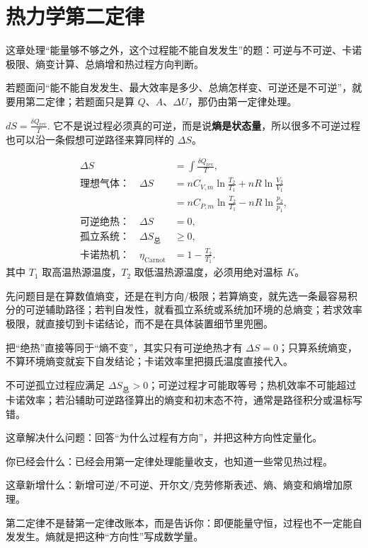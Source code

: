 \documentclass[lang=cn,11pt]{elegantbook}
\newcommand{\bridge}[1]{\begin{note}#1\end{note}}
\newcommand{\chapterroadmap}[3]{%
\begin{introduction}
 \item {\heiti 这章解决什么问题：}#1
 \item {\heiti 你已经会什么：}#2
 \item {\heiti 这章新增什么：}#3
\end{introduction}}
\begin{document}
\chapter{热力学第二定律}

\begin{skill}[第12章冲刺总手册]\label{sk:phys-ch12-overview}
 这章处理“能量够不够之外，这个过程能不能自发发生”的题：可逆与不可逆、卡诺极限、熵变计算、总熵增和热过程方向判断。

 若题面问“能不能自发发生、最大效率是多少、总熵怎样变、可逆还是不可逆”，就要用第二定律；若题面只是算 \(Q\)、\(A\)、\(\Delta U\)，那仍由第一定律处理。


 \(dS=\frac{\delta Q_{\mathrm{rev}}}{T}.\) 
它不是说过程必须真的可逆，而是说\textbf{熵是状态量}，所以很多不可逆过程也可以沿一条假想可逆路径来算同样的 \(\Delta S\)。


\[
\begin{aligned}
\Delta S&=\int \frac{\delta Q_{\mathrm{rev}}}{T},\\
\text{理想气体：}\quad
\Delta S&=nC_{V,m}\ln\frac{T_2}{T_1}+nR\ln\frac{V_2}{V_1}\\
&=nC_{P,m}\ln\frac{T_2}{T_1}-nR\ln\frac{p_2}{p_1},\\
\text{可逆绝热：}\quad
\Delta S&=0,\\
\text{孤立系统：}\quad
\Delta S_{\text{总}}&\ge 0,\\
\text{卡诺热机：}\quad
\eta_{\text{Carnot}}&=1-\frac{T_2}{T_1}.
\end{aligned}
\]
其中 \(T_1\) 取高温热源温度，\(T_2\) 取低温热源温度，必须用绝对温标 \(\si{K}\)。

 先问题目是在算数值熵变，还是在判方向/极限；若算熵变，就先选一条最容易积分的可逆辅助路径；若判自发性，就看孤立系统或系统加环境的总熵变；若求效率极限，就直接切到卡诺结论，而不是在具体装置细节里兜圈。

 把“绝热”直接等同于“熵不变”，其实只有可逆绝热才有 \(\Delta S=0\)；只算系统熵变，不算环境熵变就妄下自发结论；卡诺效率里把摄氏温度直接代入。

 不可逆孤立过程应满足 \(\Delta S_{\text{总}}>0\)；可逆过程才可能取等号；热机效率不可能超过卡诺效率；若沿辅助可逆路径算出的熵变和初末态不符，通常是路径积分或温标写错。
\end{skill}

\chapterroadmap
{回答“为什么过程有方向”，并把这种方向性定量化。}
{已经会用第一定律处理能量收支，也知道一些常见热过程。}
{新增可逆/不可逆、开尔文/克劳修斯表述、熵、熵变和熵增加原理。}

\bridge{第二定律不是替第一定律改账本，而是告诉你：即便能量守恒，过程也不一定能自发发生。熵就是把这种“方向性”写成数学量。}
\end{document}
